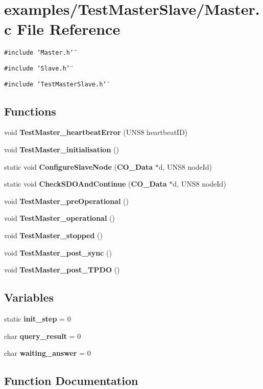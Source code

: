 \section{examples/Test\-Master\-Slave/Master.c File Reference}
\label{Master_8c}
{\tt \#include \char`\"{}Master.h\char`\"{}}\par
{\tt \#include \char`\"{}Slave.h\char`\"{}}\par
{\tt \#include \char`\"{}Test\-Master\-Slave.h\char`\"{}}\par
\subsection*{Functions}
\begin{CompactItemize}
\item 
void {\bf Test\-Master\_\-heartbeat\-Error} (UNS8 heartbeat\-ID)
\item 
void {\bf Test\-Master\_\-initialisation} ()
\item 
static void {\bf Configure\-Slave\-Node} ({\bf CO\_\-Data} $\ast$d, UNS8 node\-Id)
\item 
static void {\bf Check\-SDOAnd\-Continue} ({\bf CO\_\-Data} $\ast$d, UNS8 node\-Id)
\item 
void {\bf Test\-Master\_\-pre\-Operational} ()
\item 
void {\bf Test\-Master\_\-operational} ()
\item 
void {\bf Test\-Master\_\-stopped} ()
\item 
void {\bf Test\-Master\_\-post\_\-sync} ()
\item 
void {\bf Test\-Master\_\-post\_\-TPDO} ()
\end{CompactItemize}
\subsection*{Variables}
\begin{CompactItemize}
\item 
static {\bf init\_\-step} = 0
\item 
char {\bf query\_\-result} = 0
\item 
char {\bf waiting\_\-answer} = 0
\end{CompactItemize}


\subsection{Function Documentation}
